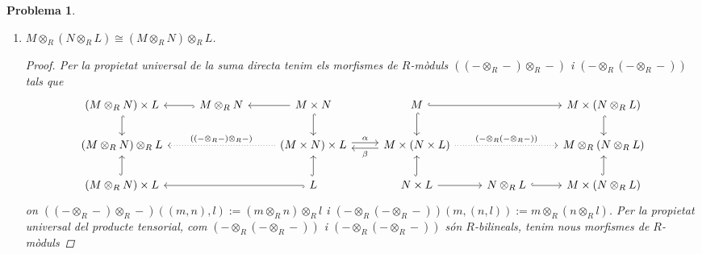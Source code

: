 \documentclass[compress]{article}
\newtheorem{problema}{Problema}
\theoremstyle{definition}
\begin{document}
\begin{problema}
\begin{enumerate}
\begin{proof}
\begin{equation*}
\begin{tikzcd}
                &N\times M
                \arrow[crossing over]{rruu}
                \arrow[shift left]{uu}
                \arrow{rr}
                &&N\otimes_{R}M
                \arrow[shift left, dotted]{uu}
                &n\otimes_{R}m
                \arrow[shift left, mapsto, dotted]{uu}
            \end{tikzcd}
            \end{equation*}
            deduïm que $M\otimes_{R}N\cong N\otimes_{R}M$.
        \end{proof}
        \item $M\otimes_{R}(N\otimes_{R}L)\cong(M\otimes_{R}N)\otimes_{R}L$.
        \begin{proof}
            Per la propietat universal de la suma directa tenim els morfismes de $R$-mòduls $((-\otimes_{R}-)\otimes_{R}-)$ i $(-\otimes_{R}(-\otimes_{R}-))$ tals que
            \begin{equation*}
            \begin{tikzcd}
                (M\otimes_{R}N)\times L
                \arrow[hook]{d}
                &M\otimes_{R}N
                \arrow[hook]{l}
                &M\times N
                \arrow{l}
                \arrow[hook]{d}
                &M
                \arrow[hook]{d}
                \arrow[hook]{rr}
                &&M\times(N\otimes_{R}L)
                \arrow[hook]{d}\\
                (M\otimes_{R}N)\otimes_{R}L
                &&(M\times N)\times L
                \arrow[shift left]{r}{\alpha}
                \arrow[dotted, swap]{ll}{((-\otimes_{R}-)\otimes_{R}-)}
                &M\times(N\times L)
                \arrow[shift left]{l}{\beta}
                \arrow[dotted]{rr}{(-\otimes_{R}(-\otimes_{R}-))}
                &&M\otimes_{R}(N\otimes_{R}L)
                \\
                (M\otimes_{R}N)\times L
                \arrow[hook]{u}
                &&L
                \arrow[hook]{u}
                \arrow[hook]{ll}
                &N\times L
                \arrow{r}
                \arrow[hook]{u}
                &N\otimes_{R}L
                \arrow[hook]{r}
                &M\times(N\otimes_{R}L)
                \arrow[hook]{u}
            \end{tikzcd}
            \end{equation*}
            on $((-\otimes_{R}-)\otimes_{R}-)((m,n),l):=(m\otimes_{R}n)\otimes_{R}l$ i $(-\otimes_{R}(-\otimes_{R}-))(m,(n,l)):=m\otimes_{R}(n\otimes_{R}l)$. Per la propietat universal del producte tensorial, com $(-\otimes_{R}(-\otimes_{R}-))$ i $(-\otimes_{R}(-\otimes_{R}-))$ són $R$-bilineals, tenim nous morfismes de $R$-mòduls

\end{proof}
\end{enumerate}
\end{problema}
\end{document}
